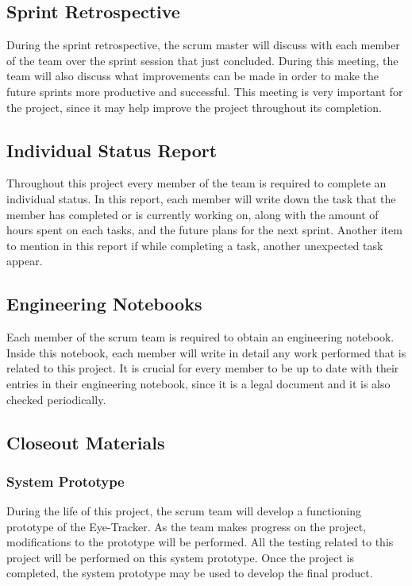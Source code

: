 \subsection{Sprint Retrospective}
During the sprint retrospective, the scrum master will discuss with each member of the team over the sprint session that just concluded. During this meeting, the team will also discuss what improvements can be made in order to make the future sprints more productive and successful. This meeting is very important for the project, since it may help improve the project throughout its completion. 

\subsection{Individual Status Report}
Throughout this project every member of the team is required to complete an individual status. In this report, each member will write down the task that the member has completed or is currently working on, along with the amount of hours spent on each tasks, and the future plans for the next sprint. Another item to mention in this report if while completing a task, another unexpected task appear.

\subsection{Engineering Notebooks}
Each member of the scrum team is required to obtain an engineering notebook. Inside this notebook, each member will write in detail any work performed that is related to this project. It is crucial for every member to be up to date with their entries in their engineering notebook, since it is a legal document and it is also checked periodically. 

\subsection{Closeout Materials}

\subsubsection{System Prototype}
During the life of this project, the scrum team will develop a functioning prototype of the Eye-Tracker. As the team makes progress on the project, modifications to the prototype will be performed. All the testing related to this project will be performed on this system prototype. Once the project is completed, the system prototype may be used to develop the final product. 

